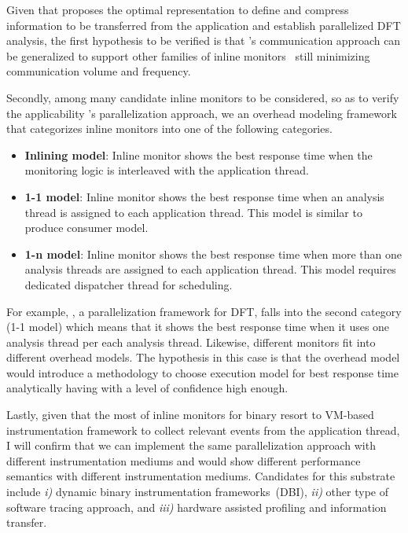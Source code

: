 %
%
Given that \sreplica proposes the optimal representation to define and compress
information to be transferred from the application and establish parallelized
DFT analysis, the first hypothesis to be verified is that \sreplica's
communication approach can be generalized to support other families of inline
monitors~\cite{cfi, memcheck} still minimizing communication volume and
frequency.

Secondly, among many candidate inline monitors to be considered, so as to
verify the applicability \sreplica's parallelization approach, we an overhead
modeling framework that categorizes inline monitors into one of the following
categories.

\begin{itemize}

    \item {\bf Inlining model}: Inline monitor shows the best response time
            when the monitoring logic is interleaved with the application
            thread.

    \item {\bf 1-1 model}: Inline monitor shows the best response time when an
            analysis thread is assigned to each application thread. This model
            is similar to produce consumer model.

    \item {\bf 1-n model}: Inline monitor shows the best response time when
            more than one analysis threads are assigned to each application
            thread.  This model requires dedicated dispatcher thread for
            scheduling.
    \end{itemize}

For example, \sreplica, a parallelization framework for DFT,  falls into the
second category (1-1 model) which means that it shows the best response time
when it uses one analysis thread per each analysis thread. Likewise, different
monitors fit into different overhead models. The hypothesis in this case is
that the overhead model would introduce a methodology to choose execution model
for best response time analytically having with a level of confidence high
enough.
 
Lastly, given that the most of inline monitors for binary resort to VM-based
instrumentation framework to collect relevant events from the application
thread, I will confirm that we can implement the same parallelization approach
with different instrumentation mediums and would show different performance
semantics with different instrumentation mediums. Candidates for this substrate
include {\it i)} dynamic binary instrumentation frameworks~(DBI), {\it ii)}
other type of software tracing approach, and {\it iii)} hardware assisted
profiling and information transfer.


